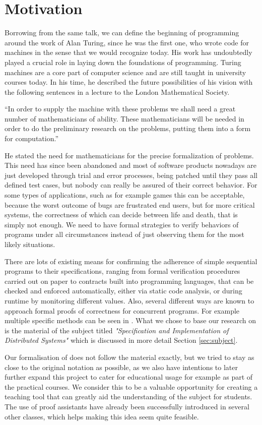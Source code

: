 \section{Motivation}

Borrowing from the same talk, we can define the beginning of programming around the work of Alan Turing, since he was the first one, who wrote code for machines in the sense that we would recognize today. His work has undoubtedly played a crucial role in laying down the foundations of programming. Turing machines are a core part of computer science and are still taught in university courses today. In his time, he described the future possibilities of his vision with the following sentences in a lecture to the London Mathematical Society\cite{turing-lecture}.

``In order to supply the machine with these problems we shall need a great number of mathematicians of ability. These mathematicians will be needed in order to do the preliminary research on the problems, putting them into a form for computation.''

He stated the need for mathematicians for the precise formalization of problems. This need has since been abandoned and most of software products nowadays are just developed through trial and error processes, being patched until they pass all defined test cases, but nobody can really be assured of their correct behavior. For some types of applications, such as for example games this can be acceptable, because the worst outcome of bugs are frustrated end users, but for more critical systems, the correctness of which can decide between life and death, that is simply not enough. We need to have formal strategies to verify behaviors of programs under all circumstances instead of just observing them for the most likely situations.

There are lots of existing means for confirming the adherence of simple sequential programs to their specifications, ranging from formal verification procedures carried out on paper to contracts built into programming languages, that can be checked and enforced automatically, either via static code analysis, or during runtime by monitoring different values. Also, several different ways are known to approach formal proofs of correctness for concurrent programs. For example multiple specific methods can be seen in \cite{hons_1202}. What we chose to base our research on is the material of the subject titled \textit{"Specification and Implementation of Distributed Systems"} which is discussed in more detail Section \ref{sec:subject}.

Our formalisation of does not follow the material exactly, but we tried to stay as close to the original notation as possible, as we also have intentions to later further expand this project to cater for educational usage for example as part of the practical courses. We consider this to be a valuable opportunity for creating a teaching tool that can greatly aid the understanding of the subject for students. The use of proof assistants have already been successfully introduced in several other classes\cite{formalsemantics-typesystems}, which helps making this idea seem quite feasible.
